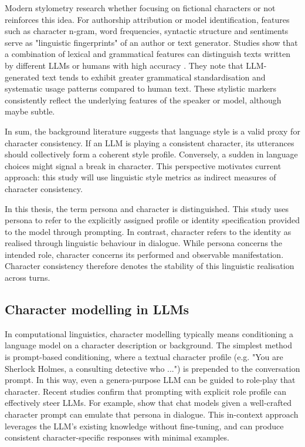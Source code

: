 \documentclass{article}
\begin{document}
Modern stylometry research whether focusing on fictional characters or not reinforces this idea. For authorship attribution or model identification, features such as character n-gram, word frequencies, syntactic structure and sentiments serve as "linguistic fingerprints" of an author or text generator. Studies show that a combination of lexical and grammatical features can distinguish texts written by different LLMs or humans with high accuracy \citep{przystalski2025stylometry}. They note that LLM-generated text tends to exhibit greater grammatical standardisation and systematic usage patterns compared to human text. These stylistic markers consistently reflect the underlying features of the speaker or model, although maybe subtle.

In sum, the background literature suggests that language style is a valid proxy for character consistency. If an LLM is playing a consistent character, its utterances should collectively form a coherent style profile. Conversely, a sudden  in language choices might signal a break in character. This perspective motivates current approach: this study will use linguistic style metrics as indirect measures of character consistency.

In this thesis, the term persona and character is distinguished. This study uses persona to refer to the explicitly assigned profile or identity specification provided to the model through prompting. In contrast, character refers to the identity as realised through linguistic behaviour in dialogue. While persona concerns the intended role, character concerns its performed and observable manifestation. Character consistency therefore denotes the stability of this linguistic realisation across turns.

\subsection{Character modelling in LLMs}

In computational linguistics, character modelling typically means conditioning a language model on a character description or background. The simplest method is prompt-based conditioning, where a textual character profile (e.g. "You are Sherlock Holmes, a consulting detective who ...") is prepended to the conversation prompt. In this way, even a genera-purpose LLM can be guided to role-play that character. Recent studies confirm that prompting with explicit role profile can effectively steer LLMs. For example, \cite{chen2023autoagents, tu2024charactereval} show that chat models given a well-crafted character prompt can emulate that persona in dialogue. This in-context approach leverages the LLM's existing knowledge without fine-tuning, and can produce consistent character-specific responses with minimal examples.
\end{document}
